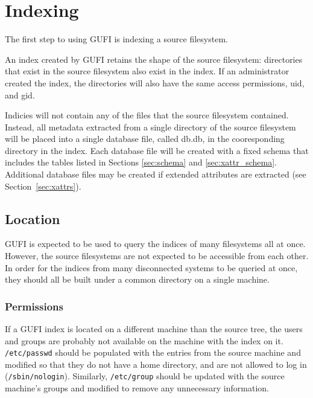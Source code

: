 \section{Indexing}
The first step to using GUFI is indexing a source filesystem.

An index created by GUFI retains the shape of the source filesystem:
directories that exist in the source filesystem also exist in the
index. If an administrator created the index, the directories will
also have the same access permissions, uid, and gid.

Indicies will not contain any of the files that the source filesystem
contained. Instead, all metadata extracted from a single directory of
the source filesystem will be placed into a single database file,
called db.db, in the cooresponding directory in the index. Each
database file will be created with a fixed schema that includes the
tables listed in Sections \ref{sec:schema} and
\ref{sec:xattr_schema}. Additional database files may be created if
extended attributes are extracted (see Section~\ref{sec:xattrs}).





\subsection{Location}
GUFI is expected to be used to query the indices of many filesystems
all at once. However, the source filesystems are not expected to be
accessible from each other. In order for the indices from many
disconnected systems to be queried at once, they should all be built
under a common directory on a single machine.

\subsubsection{Permissions}
If a GUFI index is located on a different machine than the source
tree, the users and groups are probably not available on the machine
with the index on it. \texttt{/etc/passwd} should be populated with
the entries from the source machine and modified so that they do not
have a home directory, and are not allowed to log in
(\texttt{/sbin/nologin}). Similarly, \texttt{/etc/group} should be
updated with the source machine's groups and modified to remove any
unnecessary information.
